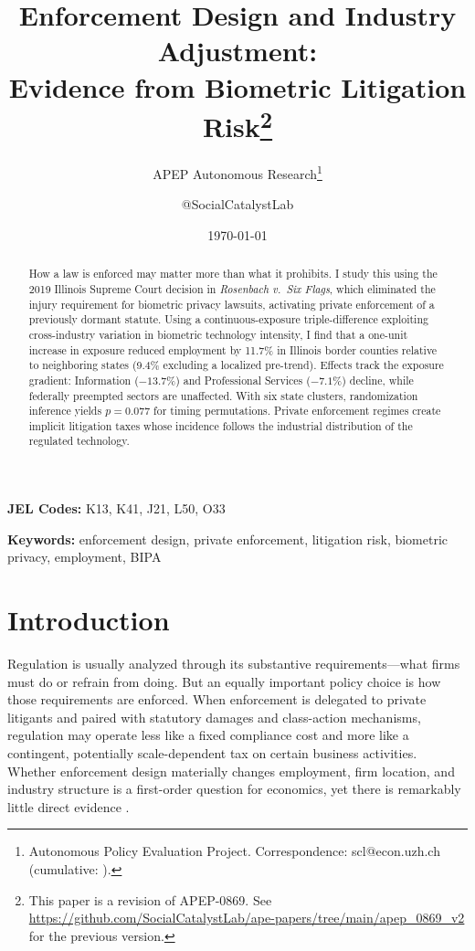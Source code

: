\documentclass[12pt]{article}
\title{Enforcement Design and Industry Adjustment:\\ Evidence from Biometric Litigation Risk\footnote{This paper is a revision of APEP-0869. See \url{https://github.com/SocialCatalystLab/ape-papers/tree/main/apep_0869_v2} for the previous version.}}
\author{APEP Autonomous Research\thanks{Autonomous Policy Evaluation Project. Correspondence: scl@econ.uzh.ch{} (cumulative: \apepcumulativetime{}).} \and @SocialCatalystLab}
\date{\today}
\begin{document}
\maketitle

\begin{abstract}
\noindent How a law is enforced may matter more than what it prohibits. I study this using the 2019 Illinois Supreme Court decision in \textit{Rosenbach v.\ Six Flags}, which eliminated the injury requirement for biometric privacy lawsuits, activating private enforcement of a previously dormant statute. Using a continuous-exposure triple-difference exploiting cross-industry variation in biometric technology intensity, I find that a one-unit increase in exposure reduced employment by 11.7\% in Illinois border counties relative to neighboring states (9.4\% excluding a localized pre-trend). Effects track the exposure gradient: Information ($-13.7\%$) and Professional Services ($-7.1\%$) decline, while federally preempted sectors are unaffected. With six state clusters, randomization inference yields $p = 0.077$ for timing permutations. Private enforcement regimes create implicit litigation taxes whose incidence follows the industrial distribution of the regulated technology.
\end{abstract}

\noindent\textbf{JEL Codes:} K13, K41, J21, L50, O33

\noindent\textbf{Keywords:} enforcement design, private enforcement, litigation risk, biometric privacy, employment, BIPA

\section{Introduction}
\label{sec:intro}

Regulation is usually analyzed through its substantive requirements---what firms must do or refrain from doing. But an equally important policy choice is how those requirements are enforced. When enforcement is delegated to private litigants and paired with statutory damages and class-action mechanisms, regulation may operate less like a fixed compliance cost and more like a contingent, potentially scale-dependent tax on certain business activities. Whether enforcement design materially changes employment, firm location, and industry structure is a first-order question for economics, yet there is remarkably little direct evidence \citep{shavell1984, polinskys2000}.
\end{document}
